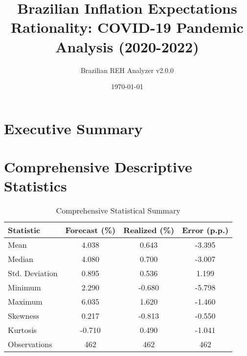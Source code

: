 \documentclass[11pt,a4paper]{article}
\title{Brazilian Inflation Expectations Rationality: COVID-19 Pandemic Analysis (2020-2022)}
\author{Brazilian REH Analyzer v2.0.0}
\date{\today}
\begin{document}
\maketitle

\section{Executive Summary}

\begin{center}
\end{center}

\section{Comprehensive Descriptive Statistics}

\begin{table}[H]
\centering
\caption{Comprehensive Statistical Summary}
\begin{tabular}{lccc}
\toprule
\textbf{Statistic} & \textbf{Forecast (\%)} & \textbf{Realized (\%)} & \textbf{Error (p.p.)} \\
\midrule
Mean & 4.038 & 0.643 & -3.395 \\
Median & 4.080 & 0.700 & -3.007 \\
Std. Deviation & 0.895 & 0.536 & 1.199 \\
Minimum & 2.290 & -0.680 & -5.798 \\
Maximum & 6.035 & 1.620 & -1.460 \\
Skewness & 0.217 & -0.813 & -0.550 \\
Kurtosis & -0.710 & 0.490 & -1.041 \\
Observations & 462 & 462 & 462 \\
\bottomrule
\end{tabular}
\end{table}
\end{document}
